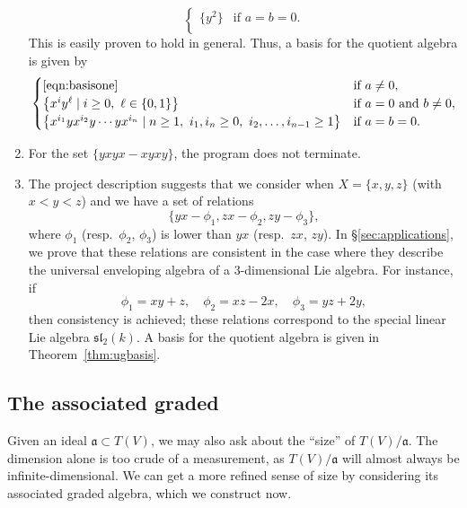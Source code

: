 \begin{enumerate}
\begin{equation*}
\begin{cases}
\{y^2\}&\text{if }a=b=0.\\
\end{cases}
        \end{equation*}
      This is easily proven to hold in general. Thus, a basis for the quotient algebra is given by
      \begin{equation*}
\begin{cases}
\eqref{eqn:basisone}&\text{if }a\ne 0,\\
\left\{x^iy^\ell\mid i\ge 0,\text{ }\ell\in\{0,1\}\right\}&\text{if }a=0\text{ and }b\ne 0,\\
\left\{x^{i_1}yx^{i_2}y\cdots yx^{i_n}\mid n\ge 1,\text{ }i_1,i_n\ge 0,\text{ }i_2,\ldots,i_{n-1}\ge 1\right\}&\text{if }a=b=0.\\
\end{cases}
      \end{equation*}
	\item For the set $\{yxyx-xyxy\}$, the program does not terminate.
    \item The project description suggests that we consider when $X = \{x,y,z\}$ (with $x<y<z$) and we have a set of relations
\begin{equation*}
\{yx-\phi_1,zx-\phi_2,zy-\phi_3\},
\end{equation*}
where $\phi_1$ (resp.\ $\phi_2$, $\phi_3$) is lower than $yx$ (resp.\ $zx$, $zy$). In \S\ref{sec:applications}, we prove that these relations are consistent in the case where they describe the universal enveloping algebra of a $3$-dimensional Lie algebra. For instance, if
\begin{equation*}
\phi_1=xy+z,\quad\phi_2=xz-2x,\quad\phi_3=yz+2y,
\end{equation*}
then consistency is achieved; these relations correspond to the special linear Lie algebra $\mathfrak{sl}_2(k)$. A basis for the quotient algebra is given in Theorem~\ref{thm:ugbasis}.
\end{enumerate}

\subsection{The associated graded}\label{sec:assoc-graded}
Given an ideal $\mathfrak{a} \subset T(V)$, we may also ask about the ``size'' of $T(V)/\mathfrak{a}$. The dimension alone is too crude of a measurement, as $T(V)/\mathfrak{a}$ will almost always be infinite-dimensional. We can get a more refined sense of size by considering its associated graded algebra, which we construct now.


